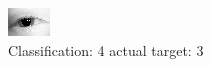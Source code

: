 \begin{figure}[h!]
\begin{center}
\includegraphics[width=0.60\columnwidth]{figures/ID49_class_4_target_3.png}
\end{center}
\caption{ Classification: 4 actual target: 3}
\label{fig:ID49_class_4_target_3}
\end{figure}
